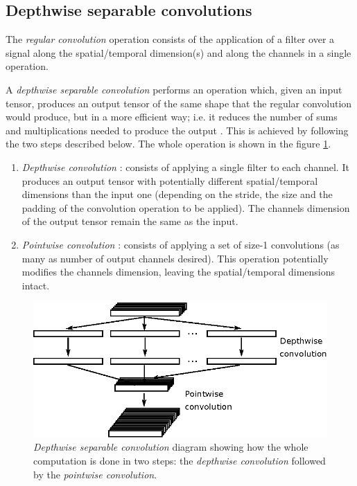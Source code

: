 \documentclass[review]{elsarticle}
\begin{document}
\subsection{Depthwise separable convolutions}
The \textit{regular convolution} operation consists of the application of a filter over a signal along the spatial/temporal dimension(s) and along the channels in a single operation. 

A \textit{depthwise separable convolution} performs an operation which, given an input tensor, produces an output tensor of the same shape that the regular convolution would produce, but in a more efficient way; i.e. it reduces the number of sums and multiplications needed to produce the output \cite{FChollet2017}. This is achieved by following the two steps described below. The whole operation is shown in the figure \ref{fig:dwsconv}.



\begin{enumerate}
	\item \textit{Depthwise convolution} \cite{Yunhui2019}: consists of applying a single filter to each channel. It produces an output tensor with potentially different spatial/temporal dimensions than the input one (depending on the stride, the size and the padding of the convolution operation to be applied). The channels dimension of the output tensor remain the same as the input.
	\item \textit{Pointwise convolution} \cite{Gao2018}: consists of applying a set of size-1 convolutions (as many as number of output channels desired). This operation potentially modifies the channels dimension, leaving the spatial/temporal dimensions intact.
\end{enumerate}

\begin{figure}
	\centering
	\includegraphics[width=0.8\linewidth]{img/dws_conv}
	\caption{\textit{Depthwise separable convolution} diagram showing how the whole computation is done in two steps: the \textit{depthwise convolution} followed by the \textit{pointwise convolution}.}
	\label{fig:dwsconv}
\end{figure}
\end{document}
